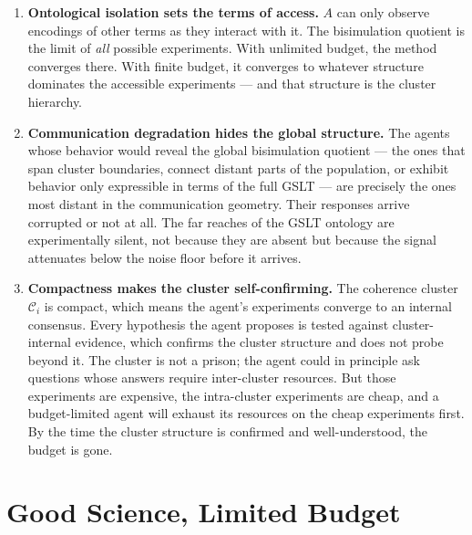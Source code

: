 \begin{enumerate}[label=\textbf{(\arabic*)}, itemsep=6pt]

  \item \textbf{Ontological isolation sets the terms of access.}
        $A$ can only observe encodings of other terms as they interact
        with it.
        The bisimulation quotient is the limit of \emph{all} possible
        experiments.
        With unlimited budget, the method converges there.
        With finite budget, it converges to whatever structure
        dominates the accessible experiments --- and that structure
        is the cluster hierarchy.

  \item \textbf{Communication degradation hides the global structure.}
        The agents whose behavior would reveal the global bisimulation
        quotient --- the ones that span cluster boundaries, connect
        distant parts of the population, or exhibit behavior only
        expressible in terms of the full GSLT --- are precisely the
        ones most distant in the communication geometry.
        Their responses arrive corrupted or not at all.
        The far reaches of the GSLT ontology are experimentally
        silent, not because they are absent but because the signal
        attenuates below the noise floor before it arrives.

  \item \textbf{Compactness makes the cluster self-confirming.}
        The coherence cluster $\mathcal{C}_i$ is compact, which means
        the agent's experiments converge to an internal consensus.
        Every hypothesis the agent proposes is tested against
        cluster-internal evidence, which confirms the cluster
        structure and does not probe beyond it.
        The cluster is not a prison; the agent could in principle
        ask questions whose answers require inter-cluster resources.
        But those experiments are expensive, the intra-cluster
        experiments are cheap, and a budget-limited agent will
        exhaust its resources on the cheap experiments first.
        By the time the cluster structure is confirmed and
        well-understood, the budget is gone.

\end{enumerate}

\section{Good Science, Limited Budget}

